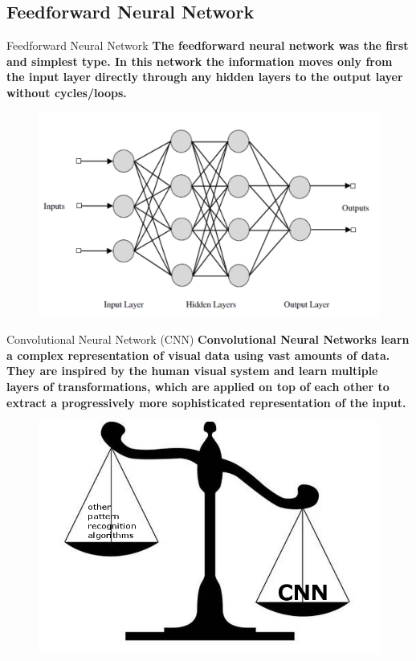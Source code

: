 \documentclass[10pt]{beamer}
\begin{document}
	\subsection{Feedforward Neural Network}
	\begin{frame}[t]{Feedforward Neural Network}
		\large{\textbf{The feedforward neural network was the first and simplest type. In this network the information moves only from the input layer directly through any hidden layers to the output layer without cycles/loops.}}
		\begin{figure}
			\includegraphics[width=0.9\linewidth]{images/feedforward}
		\end{figure}
	\end{frame}
	\begin{frame}[t]{Convolutional Neural Network (CNN)}
		\large{\textbf{Convolutional Neural Networks learn a complex representation of visual data using vast amounts of data. They are inspired by the human visual system and learn multiple layers of transformations, which are applied on top of each other to extract a progressively more sophisticated representation of the input.}}
		\begin{figure}
			\includegraphics[width=0.7\linewidth]{images/balance}
		\end{figure}
	\end{frame}
\end{document}
